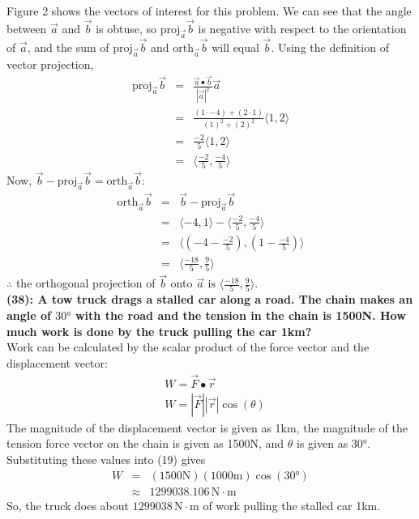 \documentclass[12]{article}
\begin{document}
Figure 2 shows the vectors of interest for this problem. We can see that the angle between $\vec{a}$ and $\vec{b}$ is obtuse, so $\mathrm{proj}_{\vec{a}} \vec{b}$ is negative with respect to the orientation of $\vec{a}$, and the sum of $\mathrm{proj}_{\vec{a}} \vec{b}$ and $\mathrm{orth}_{\vec{a}} \vec{b}$ will equal $\vec{b}$. Using the definition of vector projection,
\begin{eqnarray}
\mathrm{proj}_{\vec{a}} \vec{b} &=& \frac{\vec{a} \bullet \vec{b}}{{|\vec{a}|}^2}\vec{a}\\
&=& \frac{(1\cdot -4)+(2\cdot 1)}{{(1)}^2+{(2)}^2}\langle 1,2 \rangle\\
&=& \frac{-2}{5}\langle 1,2 \rangle\\
&=& \Big \langle \frac{-2}{5},\frac{-4}{5} \Big \rangle
\end{eqnarray}
Now, $\vec{b} - \mathrm{proj}_{\vec{a}} \vec{b} = \mathrm{orth}_{\vec{a}} \vec{b}$:
\begin{eqnarray}
\mathrm{orth}_{\vec{a}} \vec{b} &=& \vec{b} - \mathrm{proj}_{\vec{a}} \vec{b}\\
&=& \langle -4,1 \rangle - \Big \langle \frac{-2}{5},\frac{-4}{5} \Big \rangle\\
&=& \Big \langle (-4 - \frac{-2}{5}), (1- \frac{-4}{5}) \Big \rangle\\
&=& \Big \langle \frac{-18}{5}, \frac{9}{5} \Big \rangle
\end{eqnarray}
$\therefore$ the orthogonal projection of $\vec{b}$ onto $\displaystyle{
\vec{a}\,\, \mathrm{is}\,\, \Big \langle \frac{-18}{5}, \frac{9}{5} \Big \rangle
}$.\\

\textbf{(38): A tow truck drags a stalled car along a road. The chain makes an angle of $\ang{30}$ with the road and the tension in the chain is 1500N. How much work is done by the truck pulling the car 1km?
}\\

Work can be calculated by the scalar product of the force vector and the displacement vector:
\begin{eqnarray}
&W = \vec{F}\bullet\vec{r}\\
&W = |\vec{F}||\vec{r}|\cos{(\theta)}
\end{eqnarray}
The magnitude of the displacement vector is given as 1km, the magnitude of the tension force vector on the chain is given as 1500N, and $\theta$ is given as $\ang{30}$. Substituting these values into (19) gives
\begin{eqnarray}
W &=& (1500\mathrm{N})(1000\mathrm{m})\cos{(\ang{30})}\\
&\approx & 1299038.106\,\mathrm{N}\cdot\mathrm{m}
\end{eqnarray}
So, the truck does about $1299038\,\mathrm{N}\cdot\mathrm{m}$ of work pulling the stalled car 1km.
\end{document}
